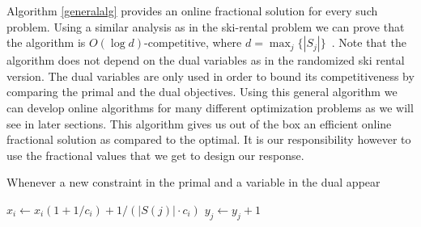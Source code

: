 Algorithm \ref{generalalg} provides an online fractional solution for every such problem. Using a similar analysis as in the ski-rental problem we can prove that the algorithm is $O(\log d)$-competitive, where \mbox{$d = \max_j\{|S_j|\}$}~\cite{buchbinder09:survey}.
Note that the algorithm does not depend on the dual variables as in the randomized ski rental version. The dual variables are only used in order to bound its competitiveness by comparing the primal and the dual objectives.
Using this general algorithm we can develop online algorithms for many different optimization problems as we will see in later sections. This algorithm gives us out of the box an efficient online fractional solution as compared to the optimal. It is our responsibility however to use the fractional values that we get to design our response.

\begin{algorithm}
\caption{Whenever a new constraint in the primal and a variable in the dual appear}
\label{generalalg}
\begin{algorithmic}[1]
    \STATE $x_i \leftarrow x_i (1 + 1/c_i) + 1/(|S(j)| \cdot c_i)$ 
  \ENDFOR
  \STATE $y_j \leftarrow y_j + 1$
\ENDWHILE
\end{algorithmic}
\end{algorithm}


